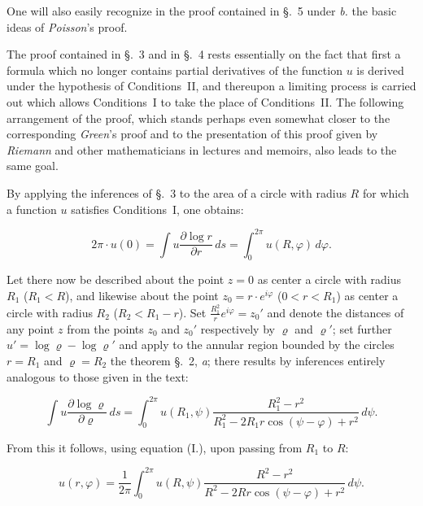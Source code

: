 \documentclass{article}
\begin{document}
One will also easily recognize in the proof contained in §.~5 under \emph{b.} the basic ideas of \emph{Poisson}'s proof.



The proof contained in §.~3 and in §.~4 rests essentially on the fact that first a formula which no longer contains partial derivatives of the function $u$ is derived under the hypothesis of Conditions~II, and thereupon a limiting process is carried out which allows Conditions~I to take the place of Conditions~II. The following arrangement of the proof, which stands perhaps even somewhat closer to the corresponding \emph{Green}'s proof and to the presentation of this proof given by \emph{Riemann} and other mathematicians in lectures and memoirs, also leads to the same goal.



By applying the inferences of §.~3 to the area of a circle with radius $R$ for which a function $u$ satisfies Conditions~I, one obtains:

\[

\tag{I.} 2\pi \cdot u(0) = \int u \frac{\partial\log r}{\partial r}\,ds = \int_0^{2\pi} u(R, \varphi)\,d\varphi.

\]



Let there now be described about the point $z = 0$ as center a circle with radius $R_1$ ($R_1 < R$), and likewise about the point $z_0 = r \cdot e^{i\varphi}$ ($0 < r < R_1$) as center a circle with radius $R_2$ ($R_2 < R_1 - r$). Set $\frac{R_1^2}{r} e^{i\varphi} = z_0'$ and denote the distances of any point $z$ from the points $z_0$ and $z_0'$ respectively by $\varrho$ and $\varrho'$; set further $u' = \log \varrho - \log \varrho'$ and apply to the annular region bounded by the circles $r = R_1$ and $\varrho = R_2$ the theorem §.~2, \emph{a}; there results by inferences entirely analogous to those given in the text:

\[

\int u \frac{\partial\log \varrho}{\partial \varrho}\,ds = \int_0^{2\pi} u(R_1, \psi) \frac{R_1^2 - r^2}{R_1^2 - 2R_1 r \cos(\psi - \varphi) + r^2}\,d\psi.

\]

From this it follows, using equation (I.), upon passing from $R_1$ to $R$:

\[

\tag{II.} u(r, \varphi) = \frac{1}{2\pi} \int_0^{2\pi} u(R, \psi) \frac{R^2 - r^2}{R^2 - 2Rr \cos(\psi - \varphi) + r^2}\,d\psi.

\]
\end{document}
